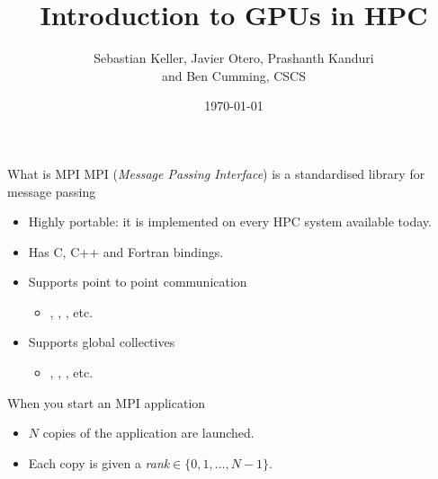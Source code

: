 \documentclass[aspectratio=43]{beamer}
\author{Sebastian Keller, Javier Otero, Prashanth Kanduri\\ and Ben Cumming, CSCS}
\title{Introduction to GPUs in HPC}
\subtitle{}
\date{\today}
\begin{document}
\cscstitle


\begin{frame}[fragile]{What is MPI}
    MPI (\emph{Message Passing Interface}) is a standardised library for message passing
    \begin{itemize}
        \item Highly portable: it is implemented on every HPC system available today.
        \item Has C, C++ and Fortran bindings.
        \item Supports point to point communication
        \begin{itemize}
            \item {}, , , etc.
        \end{itemize}
        \item Supports global collectives
        \begin{itemize}
            \item {}, , , etc.
        \end{itemize}
    \end{itemize}
    When you start an MPI application
    \begin{itemize}
        \item $N$ copies of the application are launched.
        \item Each copy is given a \emph{rank}$\in\{0,1,\dots,N-1\}$.
    \end{itemize}
\end{frame}
\end{document}
